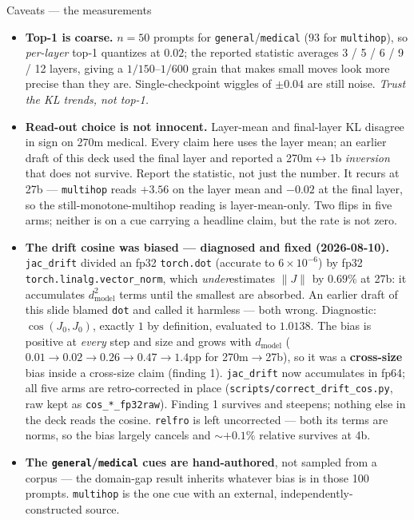 \documentclass[aspectratio=169,10pt]{beamer}
\newcommand{\good}[1]{\textcolor{up}{#1}}
\newcommand{\bad}[1]{\textcolor{down}{#1}}
\begin{document}
\begin{frame}{Caveats --- the measurements}
  \small
  \begin{itemize}\setlength{\itemsep}{0.5em}
    \item \textbf{Top-1 is coarse.} $n{=}50$ prompts for
      \texttt{general}/\texttt{medical} ($93$ for \texttt{multihop}), so
      \emph{per-layer} top-1 quantizes at $0.02$; the reported statistic
      averages 3 / 5 / 6 / 9 / 12 layers, giving a $1/150$--$1/600$ grain that
      makes small moves look more precise than they are. Single-checkpoint
      wiggles of $\pm 0.04$ are still noise. \emph{Trust the KL trends, not
      top-1.}
    \item \textbf{Read-out choice is not innocent.} Layer-mean and final-layer
      KL disagree in sign on 270m medical. Every claim here uses the layer mean;
      an earlier draft of this deck used the final layer and reported a
      270m$\leftrightarrow$1b \emph{inversion} that does not survive. Report the
      statistic, not just the number. \bad{It recurs at 27b} --- \texttt{multihop}
      reads $+3.56$ on the layer mean and $-0.02$ at the final layer, so the
      still-monotone-multihop reading is layer-mean-only. Two flips in five arms;
      neither is on a cue carrying a headline claim, but the rate is not zero.
    \item \textbf{The drift cosine was biased --- diagnosed and fixed
      (2026-08-10).} \texttt{jac\_drift} divided an fp32 \texttt{torch.dot}
      (accurate to $6{\times}10^{-6}$) by fp32
      \texttt{torch.linalg.vector\_norm}, which \emph{under}estimates $\|J\|$ by
      $0.69\%$ at 27b: it accumulates $d_\text{model}^2$ terms until the
      smallest are absorbed. \good{An earlier draft of this slide blamed
      \texttt{dot} and called it harmless --- both wrong.} Diagnostic:
      $\cos(J_0,J_0)$, exactly $1$ by definition, evaluated to $1.0138$.
      The bias is positive at \emph{every} step and size and grows with
      $d_\text{model}$ ($0.01 \to 0.02 \to 0.26 \to 0.47 \to 1.4$pp for
      270m$\to$27b), so it was a \textbf{cross-size} bias inside a cross-size
      claim (finding 1). \texttt{jac\_drift} now accumulates in fp64; all five arms
      are retro-corrected in place (\texttt{scripts/correct\_drift\_cos.py},
      raw kept as \texttt{cos\_*\_fp32raw}). Finding 1 survives
      and steepens; nothing else in the deck reads the cosine.
      \texttt{relfro} is left uncorrected --- both its terms are norms, so the
      bias largely cancels and ${\sim}+0.1\%$ relative survives at 4b.
    \item \textbf{The \texttt{general}/\texttt{medical} cues are
      hand-authored}, not sampled from a corpus --- the domain-gap result
      inherits whatever bias is in those 100 prompts. \texttt{multihop} is the
      one cue with an external, independently-constructed source.
  \end{itemize}
\end{frame}
\end{document}
